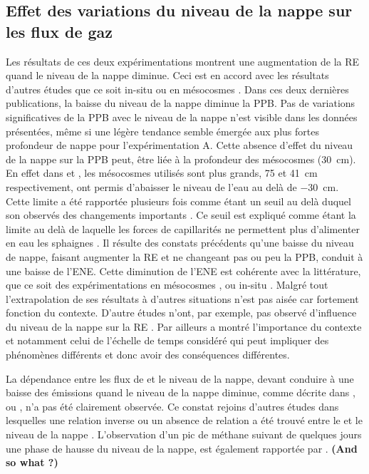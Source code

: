 \subsection{Effet des variations du niveau de la nappe sur les flux de gaz}

Les résultats de ces deux expérimentations montrent une augmentation de la RE quand le niveau de la nappe diminue.
Ceci est en accord avec les résultats d'autres études que ce soit in-situ \citep{ballantyne2014} ou en mésocosmes \citep{blodau2004,dinsmore2009}.
Dans ces deux dernières publications, la baisse du niveau de la nappe diminue la PPB.
Pas de variations significatives de la PPB avec le niveau de la nappe n'est visible dans les données présentées, même si une légère tendance semble émergée aux plus fortes profondeur de nappe pour l'expérimentation A.
Cette absence d'effet du niveau de la nappe sur la PPB peut, être liée à la profondeur des mésocosmes (\SI{30}{\centi\metre}).
En effet dans \citet{blodau2004} et \citet{dinsmore2009}, les mésocosmes utilisés sont plus grands, 75 et \SI{41}{\centi\metre} respectivement, ont permis d'abaisser le niveau de l'eau au delà de \SI{-30}{\centi\metre}.
Cette limite a été rapportée plusieurs fois comme étant un seuil au delà duquel son observés des changements importants \citep{blodau2004,peichl2014}.
Ce seuil est expliqué comme étant la limite au delà de laquelle les forces de capillarités ne permettent plus d'alimenter en eau les sphaignes \citep{rydin2013a,ketcheson2014}.
Il résulte des constats précédents qu'une baisse du niveau de nappe, faisant augmenter la RE et ne changeant pas ou peu la PPB, conduit à une baisse de l'ENE.
Cette diminution de l'ENE est cohérente avec la littérature, que ce soit des expérimentations en mésocosmes \citep{aerts1997,blodau2004}, ou in-situ \citep{bubier2003,sonnentag2010}.
Malgré tout l'extrapolation de ses résultats à d'autres situations n'est pas aisée car fortement fonction du contexte.
D'autre études n'ont, par exemple, pas observé d'influence du niveau de la nappe sur la RE \citep{updegraff2001}.
Par ailleurs \citet{laiho2006} a montré l'importance du contexte et notamment celui de l'échelle de temps considéré qui peut impliquer des phénomènes différents et donc avoir des conséquences différentes.

La dépendance entre les flux de \chh et le niveau de la nappe, devant conduire à une baisse des émissions quand le niveau de la nappe diminue, comme décrite dans \citet{aerts1997}, \citet{pelletier2007} ou \citet{turetsky2008}, n'a pas été clairement observée.
Ce constat rejoins d'autres études dans lesquelles une relation inverse ou un absence de relation a été trouvé entre le \chh et le niveau de la nappe \citet{kettunen1996,bellisario1999,treat2007}.
L'observation d'un pic de méthane suivant de quelques jours une phase de hausse du niveau de la nappe, est également rapportée par \citet{kettunen1996}. \textbf{(And so what ?)}


